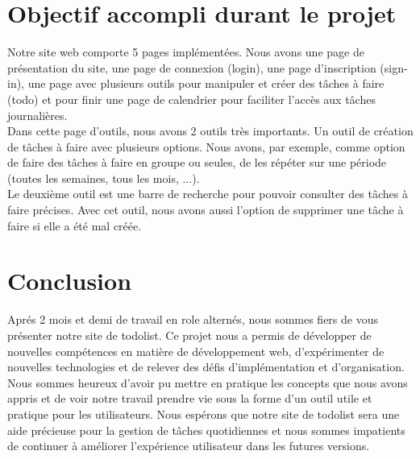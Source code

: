 \documentclass[a4paper,12pt]{report}
\begin{document}
\chapter{Objectif accompli durant le projet}

Notre site web comporte 5 pages implémentées. Nous avons une page de présentation du site, une page de connexion (login), une page d'inscription (sign-in), une page avec plusieurs outils pour manipuler et créer des tâches à faire (todo) et pour finir une page de calendrier pour faciliter l'accès aux tâches journalières.\\

Dans cette page d'outils, nous avons 2 outils très importants. Un outil de création de tâches à faire avec plusieurs options. Nous avons, par exemple, comme option de faire des tâches à faire en groupe ou seules, de les répéter sur une période (toutes les semaines, tous les mois, ...).\\
Le deuxième outil est une barre de recherche pour pouvoir consulter des tâches à faire précises. Avec cet outil, nous avons aussi l'option de supprimer une tâche à faire si elle a été mal créée.



\chapter{Conclusion}
Aprés 2 mois et demi de travail en role alternés, nous sommes fiers de vous présenter notre site de todolist.
Ce projet nous a permis de développer de nouvelles compétences en matière de développement web,
d'expérimenter de nouvelles technologies et de relever des défis d'implémentation et d'organisation.
Nous sommes heureux d'avoir pu mettre en pratique les concepts que nous avons appris et de voir 
notre travail prendre vie sous la forme d'un outil utile et pratique pour les utilisateurs. 
Nous espérons que notre site de todolist sera une aide précieuse pour la gestion de tâches quotidiennes et nous
sommes impatients de continuer à améliorer l'expérience utilisateur dans les futures versions.
\end{document}
